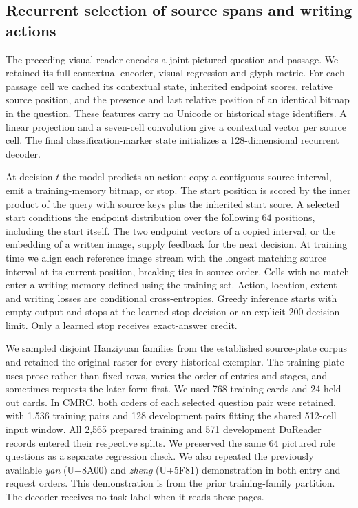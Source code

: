 \subsection*{Recurrent selection of source spans and writing actions}
The preceding visual reader encodes a joint pictured question and passage. We retained its full contextual encoder, visual regression and glyph metric. For each passage cell we cached its contextual state, inherited endpoint scores, relative source position, and the presence and last relative position of an identical bitmap in the question. These features carry no Unicode or historical stage identifiers. A linear projection and a seven-cell convolution give a contextual vector per source cell. The final classification-marker state initializes a 128-dimensional recurrent decoder.

At decision $t$ the model predicts an action: copy a contiguous source interval, emit a training-memory bitmap, or stop. The start position is scored by the inner product of the query with source keys plus the inherited start score. A selected start conditions the endpoint distribution over the following 64 positions, including the start itself. The two endpoint vectors of a copied interval, or the embedding of a written image, supply feedback for the next decision. At training time we align each reference image stream with the longest matching source interval at its current position, breaking ties in source order. Cells with no match enter a writing memory defined using the training set. Action, location, extent and writing losses are conditional cross-entropies. Greedy inference starts with empty output and stops at the learned stop decision or an explicit 200-decision limit. Only a learned stop receives exact-answer credit.

We sampled disjoint Hanziyuan families from the established source-plate corpus and retained the original raster for every historical exemplar. The training plate uses prose rather than fixed rows, varies the order of entries and stages, and sometimes requests the later form first. We used 768 training cards and 24 held-out cards. In CMRC, both orders of each selected question pair were retained, with 1,536 training pairs and 128 development pairs fitting the shared 512-cell input window. All 2,565 prepared training and 571 development DuReader records entered their respective splits. We preserved the same 64 pictured role questions as a separate regression check. We also repeated the previously available \textit{yan} (U+8A00) and \textit{zheng} (U+5F81) demonstration in both entry and request orders. This demonstration is from the prior training-family partition. The decoder receives no task label when it reads these pages.

